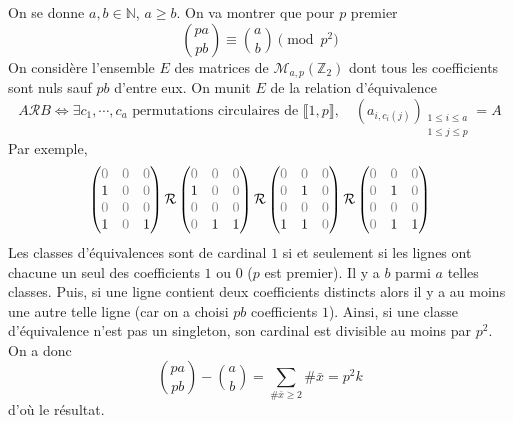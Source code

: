 On se donne $a, b\in\mathbb N$, $a\geq b$. On va montrer que pour $p$ premier \[
    \binom{pa}{pb}\equiv \binom ab\pmod {p^2}
\]
On considère l'ensemble $E$ des matrices de $\mathcal M_{a,p}(\mathbb Z_2)$ dont tous les coefficients sont nuls sauf $pb$ d'entre eux. On munit $E$ de la relation d'équivalence \[
    A\mathcal RB\iff \exists c_1, \cdots, c_a \text{ permutations circulaires de }\llbracket 1, p\rrbracket, \quad (a_{i, c_i(j)})_{\substack{1\leq i\leq a\\ 1\leq j\leq p}}=A
\]
Par exemple, \[
    \begin{pmatrix}
        {\color{gray}0}&{\color{gray}0}&{\color{gray}0}\\1&{\color{gray}0}&{\color{gray}0}\\{\color{gray}0}&{\color{gray}0}&{\color{gray}0}\\1&{\color{gray}0}&1
    \end{pmatrix}\mathcal R
    \begin{pmatrix}
        {\color{gray}0}&{\color{gray}0}&{\color{gray}0}\\1&{\color{gray}0}&{\color{gray}0}\\{\color{gray}0}&{\color{gray}0}&{\color{gray}0}\\{\color{gray}0}&1&1
    \end{pmatrix}\mathcal R
    \begin{pmatrix}
        {\color{gray}0}&{\color{gray}0}&{\color{gray}0}\\{\color{gray}0}&1&{\color{gray}0}\\{\color{gray}0}&{\color{gray}0}&{\color{gray}0}\\1&1&{\color{gray}0}
    \end{pmatrix}\mathcal R
    \begin{pmatrix}
        {\color{gray}0}&{\color{gray}0}&{\color{gray}0}\\{\color{gray}0}&1&{\color{gray}0}\\{\color{gray}0}&{\color{gray}0}&{\color{gray}0}\\{\color{gray}0}&1&1
    \end{pmatrix}
\]
Les classes d'équivalences sont de cardinal $1$ si et seulement si les lignes ont chacune un seul des coefficients $1$ ou $0$ ($p$ est premier). Il y a $b$ parmi $a$ telles classes. Puis, si une ligne contient deux coefficients distincts alors il y a au moins une autre telle ligne (car on a choisi $pb$ coefficients $1$). Ainsi, si une classe d'équivalence n'est pas un singleton, son cardinal est divisible au moins par $p^2$. On a donc \[
    \binom{pa}{pb}-\binom ab=\sum_{\#\bar x\geq 2}\#\bar x=p^2k
\]
d'où le résultat.

